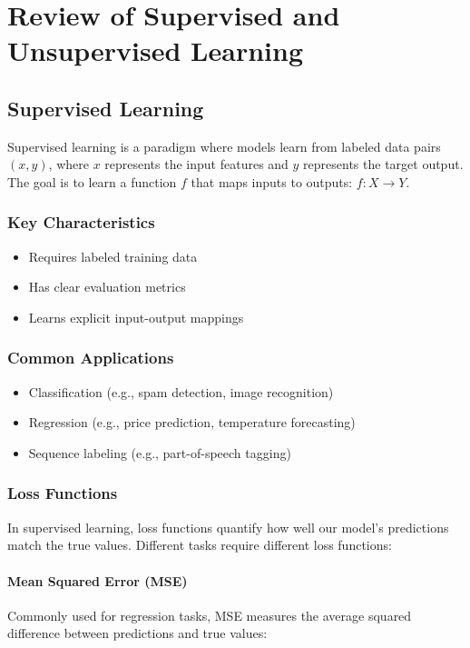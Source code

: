 \section{Review of Supervised and Unsupervised Learning}
\label{sec:review_of_supervised_and_unsupervised_learning}

\subsection{Supervised Learning}

Supervised learning is a paradigm where models learn from labeled data pairs $(x, y)$, where $x$ represents the input features and $y$ represents the target output. The goal is to learn a function $f$ that maps inputs to outputs: $f: X \rightarrow Y$.

\subsubsection{Key Characteristics}
\begin{itemize}[noitemsep]
    \item Requires labeled training data
    \item Has clear evaluation metrics
    \item Learns explicit input-output mappings
\end{itemize}

\subsubsection{Common Applications}
\begin{itemize}[noitemsep]
    \item Classification (e.g., spam detection, image recognition)
    \item Regression (e.g., price prediction, temperature forecasting)
    \item Sequence labeling (e.g., part-of-speech tagging)
\end{itemize}

\subsubsection{Loss Functions}
In supervised learning, loss functions quantify how well our model's predictions match the true values. Different tasks require different loss functions:

\paragraph{Mean Squared Error (MSE)}
Commonly used for regression tasks, MSE measures the average squared difference between predictions and true values:

